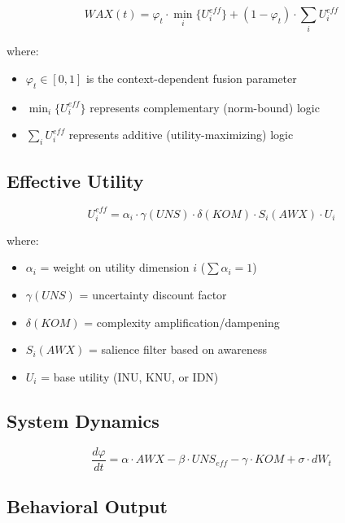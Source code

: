 \begin{equation}
\boxed{WAX(t) = \varphi_t \cdot \min_i\{U_i^{eff}\} + (1-\varphi_t) \cdot \sum_i U_i^{eff}}
\label{eq:wax-master}
\end{equation}

where:
\begin{itemize}
\item $\varphi_t \in [0,1]$ is the context-dependent fusion parameter
\item $\min_i\{U_i^{eff}\}$ represents complementary (norm-bound) logic
\item $\sum_i U_i^{eff}$ represents additive (utility-maximizing) logic
\end{itemize}

\subsection{Effective Utility}

\begin{equation}
U_i^{eff} = \alpha_i \cdot \gamma(UNS) \cdot \delta(KOM) \cdot S_i(AWX) \cdot U_i
\label{eq:effective-utility}
\end{equation}

where:
\begin{itemize}
\item $\alpha_i$ = weight on utility dimension $i$ ($\sum \alpha_i = 1$)
\item $\gamma(UNS)$ = uncertainty discount factor
\item $\delta(KOM)$ = complexity amplification/dampening
\item $S_i(AWX)$ = salience filter based on awareness
\item $U_i$ = base utility (INU, KNU, or IDN)
\end{itemize}

\subsection{System Dynamics}

\begin{equation}
\frac{d\varphi}{dt} = \alpha \cdot AWX - \beta \cdot UNS_{eff} - \gamma \cdot KOM + \sigma \cdot dW_t
\label{eq:phi-dynamics}
\end{equation}

\subsection{Behavioral Output}

